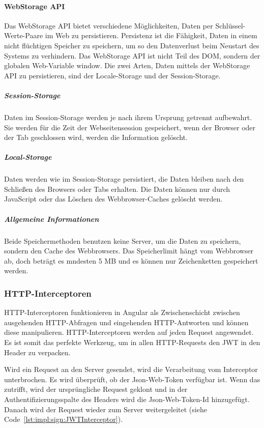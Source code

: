 \paragraph{WebStorage API}
\label{par:impl:usermanagment:WebStorage}
Das WebStorage API bietet verschiedene Möglichkeiten, Daten per Schlüssel-Werte-Paare im Web zu persistieren. Persistenz ist die Fähigkeit, Daten in einem nicht flüchtigen Speicher zu speichern, um so den Datenverlust beim Neustart des Systems zu verhindern. Das WebStorage API ist nicht Teil des DOM, sondern der globalen Web-Variable window. Die zwei Arten, Daten mittels der WebStorage API zu persistieren, sind der Locale-Storage und der Session-Storage.
\cite{WikiPersistenzDefinition} \cite{WebStorageAPI}


\subparagraph{Session-Storage}
Daten im Session-Storage werden je nach ihrem Ursprung getrennt aufbewahrt. Sie werden für die Zeit der Webseitensession gespeichert, wenn der Browser oder der Tab geschlossen wird, werden die Information gelöscht.
\cite{WebStorageAPI}

\subparagraph{Local-Storage}
Daten werden wie im Session-Storage persistiert, die Daten bleiben nach den Schließen des Browsers oder Tabs erhalten. Die Daten können nur durch JavaScript oder das Löschen des Webbrowser-Caches gelöscht werden.
\cite{WebStorageAPI}

\subparagraph{Allgemeine Informationen}
Beide Speichermethoden benutzen keine Server, um die Daten zu speichern, sondern den Cache des Webbrowsers. Das Speicherlimit hängt vom Webbrowser ab, doch beträgt es mndesten 5 MB und es können nur Zeichenketten gespeichert werden.
\cite{WebStorageAPI}

\subsubsection{HTTP-Interceptoren}
\label{sec:httpinterceptor}
HTTP-Interceptoren funktionieren in Angular als Zwischenschicht zwischen ausgehenden HTTP-Abfragen und eingehenden HTTP-Antworten und können diese manipulieren.
 HTTP-Interceptoren werden auf jeden Request angewendet. Es ist somit das perfekte Werkzeug, um in allen HTTP-Requests den JWT in den Header zu verpacken.
\cite[10.3 Interceptoren: HTTP-Requests abfangen und transformieren]{AngularBuch}

Wird ein Request an den Server gesendet, wird die Verarbeitung vom Interceptor unterbrochen. Es wird überprüft, ob der Json-Web-Token verfügbar ist. Wenn das zutrifft, wird der ursprüngliche Request geklont und in der Authentifizierungsspalte des Headers wird die Json-Web-Token-Id hinzugefügt. Danach wird der Request wieder zum Server weitergeleitet (siehe Code \ref{lst:impl:sign:JWTInterceptor}). 

